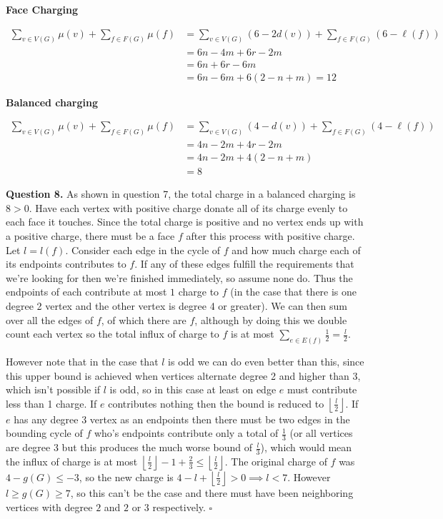 \documentclass[letterpaper, reqno,11pt]{article}
\begin{document}
\textbf{Face Charging}

\begin{align*}
\sum_{v\in V(G)}\mu(v) + \sum_{f\in F(G)} \mu(f) &= \sum_{v\in V(G)} (6 - 2d(v)) + \sum_{f \in F(G)} (6 - \ell(f))\\
&= 6n - 4m + 6r - 2m\\
&= 6n + 6r - 6m\\
&= 6n - 6m + 6(2 - n + m) = 12 
\end{align*}

\textbf{Balanced charging}

\begin{align*}
\sum_{v \in V(G)} \mu(v) + \sum_{f\in F(G)} \mu(f) &= \sum_{v \in V(G)} (4- d(v)) + \sum_{f \in F(G)}(4 - \ell(f))\\
&=4n - 2m + 4r - 2m\\
&=4n - 2m + 4(2 - n + m)\\
&=8
\end{align*}

{\medskip\noindent\bf Question 8.} As shown in question 7, the total charge in a balanced charging is $8>0$. Have each vertex with positive charge donate all of its charge evenly to each face it touches. Since the total charge is positive and no vertex ends up with a positive charge, there must be a face $f$ after this process with positive charge. Let $l=l(f)$. Consider each edge in the cycle of $f$ and how much charge each of its endpoints contributes to $f$. If any of these edges fulfill the requirements that we're looking for then we're finished immediately, so assume none do. Thus the endpoints of each contribute at most $1$ charge to $f$ (in the case that there is one degree 2 vertex and the other vertex is degree 4 or greater). We can then sum over all the edges of $f$, of which there are $f$, although by doing this we double count each vertex so the total influx of charge to $f$ is at most $\sum_{e\in E(f)}\frac{1}{2}=\frac{l}{2}$. 

However note that in the case that $l$ is odd we can do even better than this, since this upper bound is achieved when vertices alternate degree 2 and higher than 3, which isn't possible if $l$ is odd, so in this case at least on edge $e$ must contribute less than 1 charge. If $e$ contributes nothing then the bound is reduced to $\left\lfloor \frac{l}{2} \right\rfloor$. If $e$ has any degree 3 vertex as an endpoints then there must be two edges in the bounding cycle of $f$ who's endpoints contribute only a total of $\frac{1}{3}$ (or all vertices are degree 3 but this produces the much worse bound of $\frac{l}{3}$), which would mean the influx of charge is at most $\left\lfloor \frac{l}{2} \right\rfloor-1+\frac{2}{3}\leq \left\lfloor \frac{l}{2} \right\rfloor$. The original charge of $f$ was $4-g(G)\leq -3$, so the new charge is $4-l+\left\lfloor \frac{l}{2} \right\rfloor >0\implies l<7$. However $l\geq g(G)\geq 7$, so this can't be the case and there must have been neighboring vertices with degree $2$ and $2$ or $3$ respectively. $\square$
\end{document}
